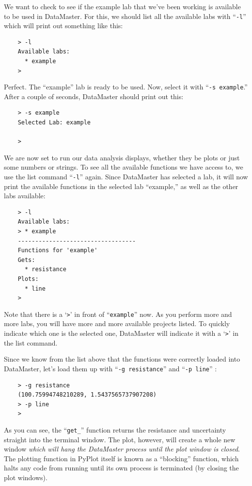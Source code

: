 \documentclass[12pt]{article}
\begin{document}
{\begin{framed}
\begin{lstlisting}
  \end{lstlisting}
\end{framed}
We want to check to see if the example lab that we've been working is available to be used in DataMaster. For this, we should list all the available labs with ``\texttt{-l}'' which will print out something like this:
\begin{framed}
  \begin{lstlisting}
    > -l
    Available labs:
      * example
    > 
  \end{lstlisting}
\end{framed}
Perfect. The ``example'' lab is ready to be used. Now, select it with ``\texttt{-s example}.'' After a couple of seconds, DataMaster should print out this:
\begin{framed}
  \begin{lstlisting}
    > -s example
    Selected Lab: example

    > 
  \end{lstlisting}
\end{framed}
We are now set to run our data analysis displays, whether they be plots or just some numbers or strings. To see all the available functions we have access to, we use the list command ``\texttt{-l}'' again. Since DataMaster has selected a lab, it will now print the available functions in the selected lab ``example,'' as well as the other labs available:
\begin{framed}
  \begin{lstlisting}
    > -l 
    Available labs:
    > * example
    ----------------------------------
    Functions for 'example'
    Gets:
      * resistance
    Plots:
      * line
    > 
  \end{lstlisting}
\end{framed}
Note that there is a `\texttt{>}' in front of ``\texttt{example}'' now. As you perform more and more labs, you will have more and more available projects listed. To quickly indicate which one is the selected one, DataMaster will indicate it with a `\texttt{>}' in the list command.

Since we know from the list above that the functions were correctly loaded into DataMaster, let's load them up with ``\texttt{-g resistance}'' and ``\texttt{-p line}'' : 
\begin{framed}
  \begin{lstlisting}
    > -g resistance
    (100.75994748210289, 1.5437565737907208)
    > -p line
    > 
  \end{lstlisting}
\end{framed}
As you can see, the ``\texttt{get\_}'' function returns the resistance and uncertainty straight into the terminal window. The plot, however, will create a whole new window \textit{which will hang the DataMaster process until the plot window is closed}. The plotting function in PyPlot itself is known as a ``blocking'' function, which halts any code from running until its own process is terminated (by closing the plot windows).

}
\end{document}
